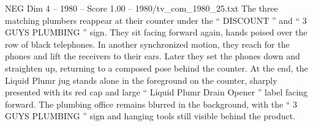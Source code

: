 \begin{textsample}{NEG Dim 4 – 1980 – Score 1.00 – 1980/tv\_com\_1980\_25.txt}
The three matching plumbers reappear at their counter under the “ DISCOUNT ” and “ 3 GUYS PLUMBING ” sign.
They sit facing forward again, hands poised over the row of black telephones.
In another synchronized motion, they reach for the phones and lift the receivers to their ears.
Later they set the phones down and straighten up, returning to a composed pose behind the counter.
At the end, the Liquid Plumr jug stands alone in the foreground on the counter, sharply presented with its red cap and large “ Liquid Plumr Drain Opener ” label facing forward.
The plumbing office remains blurred in the background, with the “ 3 GUYS PLUMBING ” sign and hanging tools still visible behind the product.

\end{textsample}
